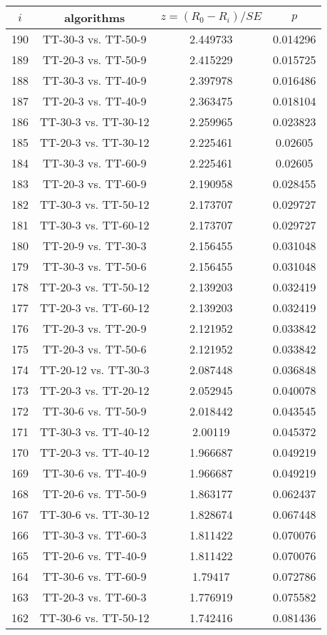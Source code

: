 \documentclass[a4paper,10pt]{article}
\begin{document}
\begin{landscape}
\begin{table}[!htp]
\centering\scriptsize
\begin{tabular}{cccc}
$i$&algorithms&$z=(R_0 - R_i)/SE$&$p$\\
\hline190&TT-30-3 vs. TT-50-9&2.449733&0.014296\\
189&TT-20-3 vs. TT-50-9&2.415229&0.015725\\
188&TT-30-3 vs. TT-40-9&2.397978&0.016486\\
187&TT-20-3 vs. TT-40-9&2.363475&0.018104\\
186&TT-30-3 vs. TT-30-12&2.259965&0.023823\\
185&TT-20-3 vs. TT-30-12&2.225461&0.02605\\
184&TT-30-3 vs. TT-60-9&2.225461&0.02605\\
183&TT-20-3 vs. TT-60-9&2.190958&0.028455\\
182&TT-30-3 vs. TT-50-12&2.173707&0.029727\\
181&TT-30-3 vs. TT-60-12&2.173707&0.029727\\
180&TT-20-9 vs. TT-30-3&2.156455&0.031048\\
179&TT-30-3 vs. TT-50-6&2.156455&0.031048\\
178&TT-20-3 vs. TT-50-12&2.139203&0.032419\\
177&TT-20-3 vs. TT-60-12&2.139203&0.032419\\
176&TT-20-3 vs. TT-20-9&2.121952&0.033842\\
175&TT-20-3 vs. TT-50-6&2.121952&0.033842\\
174&TT-20-12 vs. TT-30-3&2.087448&0.036848\\
173&TT-20-3 vs. TT-20-12&2.052945&0.040078\\
172&TT-30-6 vs. TT-50-9&2.018442&0.043545\\
171&TT-30-3 vs. TT-40-12&2.00119&0.045372\\
170&TT-20-3 vs. TT-40-12&1.966687&0.049219\\
169&TT-30-6 vs. TT-40-9&1.966687&0.049219\\
168&TT-20-6 vs. TT-50-9&1.863177&0.062437\\
167&TT-30-6 vs. TT-30-12&1.828674&0.067448\\
166&TT-30-3 vs. TT-60-3&1.811422&0.070076\\
165&TT-20-6 vs. TT-40-9&1.811422&0.070076\\
164&TT-30-6 vs. TT-60-9&1.79417&0.072786\\
163&TT-20-3 vs. TT-60-3&1.776919&0.075582\\
162&TT-30-6 vs. TT-50-12&1.742416&0.081436\\

\end{tabular}
\end{table}
\end{landscape}
\end{document}
